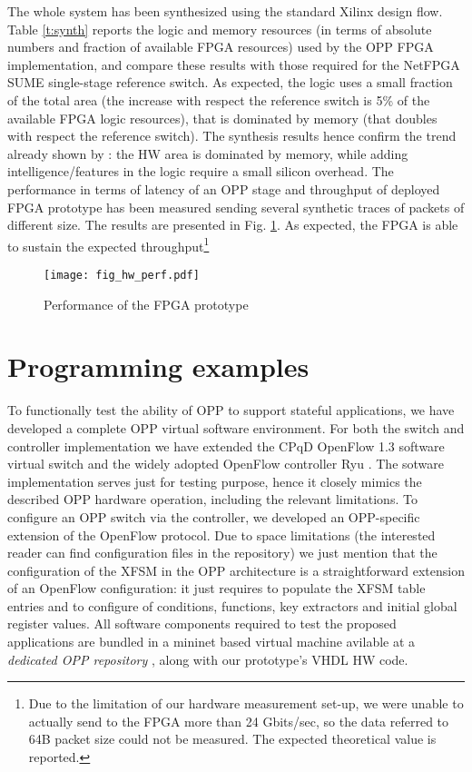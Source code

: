 \documentclass{sig-alternate}
\begin{document}
The whole system has been synthesized using the standard Xilinx design flow. Table \ref{t:synth} reports the logic and memory resources (in terms of absolute numbers and fraction of available FPGA resources) used by the OPP FPGA implementation, and compare these results with those required for the NetFPGA SUME single-stage reference switch. As expected, the logic uses a small fraction of the total area (the increase with respect the reference switch is 5\% of the available FPGA logic resources), that is dominated by memory (that doubles with respect the reference switch). The synthesis results hence confirm the trend already shown by \cite{Bos13}: the HW area is dominated by memory, while adding intelligence/features in the logic require a small silicon overhead. The performance in terms of latency of an OPP stage and throughput of deployed FPGA prototype has been measured sending several synthetic traces of packets of different size. The results are presented in Fig. \ref{F:perfo}. As expected, the FPGA is able to sustain the expected throughput\footnote{Due to the limitation of our hardware measurement set-up, we were unable to actually send to the FPGA more than 24 Gbits/sec, so the data referred to 64B packet size could not be measured. The expected theoretical value is reported.}

\begin{figure}[t]
    \centering
    \texttt{[image: fig\_hw\_perf.pdf]}
          	  \vspace{-1em}
    \caption{Performance of the FPGA prototype}
          	  \vspace{-1.2em}
    \label{F:perfo}
 \end{figure}



\section{Programming examples}
\label{s:usecases}

To functionally test the ability of OPP to support stateful applications, we have developed a complete OPP virtual software environment. For both the switch and controller implementation we have extended the CPqD OpenFlow 1.3 software virtual switch \cite{ofsoftswitch13} and the widely adopted OpenFlow controller Ryu \cite{ryu}. The sotware implementation serves just for testing purpose, hence it closely mimics the described OPP hardware operation, including the relevant limitations. To configure an OPP switch via the controller, we developed an OPP-specific extension of the OpenFlow protocol. Due to space limitations (the interested reader can find configuration files in the repository) we just mention that the configuration of the XFSM in the OPP architecture is a straightforward extension of an OpenFlow configuration: it just requires to populate the XFSM table entries and to configure of conditions, functions, key extractors and initial global register values. All software components required to test the proposed applications are bundled in a mininet \cite{mininet} based virtual machine avilable at a {\em dedicated OPP repository} \cite{repository}, along with our prototype's VHDL HW code. 
\end{document}
